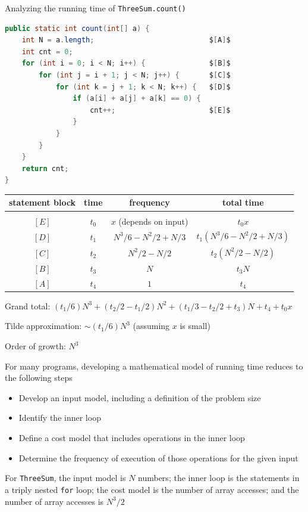 \documentclass[8pt,a4paper,compress]{beamer}
\begin{document}
\begin{frame}[fragile]
Analyzing the running time of \lstinline{ThreeSum.count()}
\begin{lstlisting}[language=Java, mathescape]
public static int count(int[] a) {
    int N = a.length;                           $[A]$
    int cnt = 0;
    for (int i = 0; i < N; i++) {               $[B]$ 
        for (int j = i + 1; j < N; j++) {       $[C]$
            for (int k = j + 1; k < N; k++) {   $[D]$
                if (a[i] + a[j] + a[k] == 0) {
                    cnt++;                      $[E]$
                }
            }
        }
    }
    return cnt;
}
\end{lstlisting}
\begin{center}
\begin{tabular}{cccc}
statement block & time & frequency & total time\\ \hline \\
$[E]$ & $t_0$ & $x$ (depends on input) & $t_0x$ \\
$[D]$ & $t_1$ & $N^3/6-N^2/2+N/3$  & $t_1(N^3/6-N^2/2+N/3)$ \\
$[C]$ & $t_2$ & $N^2/2-N/2$  & $t_2(N^2/2-N/2)$ \\
$[B]$ & $t_3$ & $N$  & $t_3N$ \\
$[A]$ & $t_4$ & $1$  & $t_4$ 
\end{tabular} 
\end{center}
Grand total: $(t_1/6)N^3+(t_2/2-t_1/2)N^2+(t_1/3-t_2/2+t_3)N+t_4+t_0x$

\smallskip

Tilde approximation: $\sim(t_1/6)N^3$ (assuming $x$ is small)

\smallskip

Order of growth: $N^3$
\end{frame}

\begin{frame}[fragile]
For many programs, developing a mathematical model of running time reduces to the following steps
\begin{itemize}
\item Develop an input model, including a definition of the problem size
\item Identify the inner loop
\item Define a cost model that includes operations in the inner loop
\item Determine the frequency of execution of those operations for the given input
\end{itemize}

\bigskip

For \lstinline{ThreeSum}, the input model is $N$ numbers; the inner loop is the statements in a triply nested \lstinline{for} loop; the cost model is the number of array accesses; and the number of array accesses is $N^3/2$
\end{frame}
\end{document}
